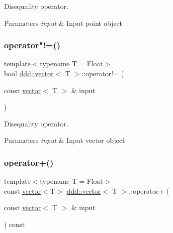 Disequality operator. 


\begin{DoxyParams}{Parameters}
{\em input} & Input point object \\
\hline
\end{DoxyParams}
\mbox{\label{classddd_1_1vector_a83fb6aea4121e7737ab7642aae23e2df}} 
\subsubsection{\texorpdfstring{operator"!=()}{operator!=()}\hspace{0.1cm}{\footnotesize\ttfamily [2/2]}}
{\footnotesize\ttfamily template$<$typename T = Float$>$ \\
bool \hyperlink{classddd_1_1vector}{ddd\+::vector}$<$ T $>$\+::operator!= (\begin{DoxyParamCaption}\item[{const \hyperlink{classddd_1_1vector}{vector}$<$ T $>$ \&}]{input }\end{DoxyParamCaption})\hspace{0.3cm}{\ttfamily [inline]}}



Disequality operator. 


\begin{DoxyParams}{Parameters}
{\em input} & Input vector object \\
\hline
\end{DoxyParams}
\mbox{\label{classddd_1_1vector_a1d49d5831ff14a0845a0ce3ac0f4e02d}} 
\subsubsection{\texorpdfstring{operator+()}{operator+()}\hspace{0.1cm}{\footnotesize\ttfamily [1/2]}}
{\footnotesize\ttfamily template$<$typename T = Float$>$ \\
const \hyperlink{classddd_1_1vector}{vector}$<$T$>$ \hyperlink{classddd_1_1vector}{ddd\+::vector}$<$ T $>$\+::operator+ (\begin{DoxyParamCaption}\item[{const \hyperlink{classddd_1_1vector}{vector}$<$ T $>$ \&}]{input }\end{DoxyParamCaption}) const\hspace{0.3cm}{\ttfamily [inline]}}



